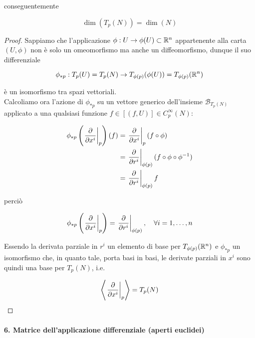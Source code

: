 conseguentemente

\begin{equation}
	\dim(T_{p}(N)) = \dim(N)
\end{equation}

\begin{proof}
	Sappiamo che l'applicazione $ \phi : U \to \phi(U) \subset \mathbb{R}^{n} $ appartenente alla carta $ (U,\phi) $ non è solo un omeomorfismo ma anche un diffeomorfismo, dunque il suo differenziale
	
	\begin{equation}
		\phi_{*p} : T_{p}(U) = T_{p}(N) \to T_{\phi(p)}(\phi(U)) = T_{\phi(p)}(\mathbb{R}^{n})
	\end{equation}

	è un isomorfismo tra spazi vettoriali.\\
	Calcoliamo ora l'azione di $ \phi_{*p} $ su un vettore generico dell'insieme $ \mathcal{B}_{T_{p}(N)} $ applicato a una qualsiasi funzione $ f \in [(f,U)] \in C_{p}^{\infty}(N) $:
	
	\begin{align}
		\begin{split}
			\phi_{*p} \left( \eval{ \pdv{x^{i}} }_{p} \right) (f) &= \eval{ \pdv{x^{i}} }_{p} (f \circ \phi)\\
			&= \eval{ \pdv{r^{i}} }_{\phi(p)} (f \circ \phi \circ \phi^{-1})\\
			&= \eval{ \pdv{r^{i}} }_{\phi(p)} f
		\end{split}
	\end{align}

	perciò
	
	\begin{equation}
		\phi_{*p} \left( \eval{ \pdv{x^{i}} }_{p} \right) = \eval{ \pdv{r^{i}} }_{\phi(p)} \qcomma \forall i=1,\dots,n
	\end{equation}

	Essendo la derivata parziale in $ r^{i} $ un elemento di base per $ T_{\phi(p)}(\mathbb{R}^{n}) $ e $ \phi_{*p} $ un isomorfismo che, in quanto tale, porta basi in basi, le derivate parziali in $ x^{i} $ sono quindi una base per $ T_{p}(N) $, i.e.
	
	\begin{equation}
		\ev{ \eval{ \pdv{x^{i}} }_{p} } = T_{p}(N)
	\end{equation}
\end{proof}

\paragraph{6. Matrice dell'applicazione differenziale (aperti euclidei)}


